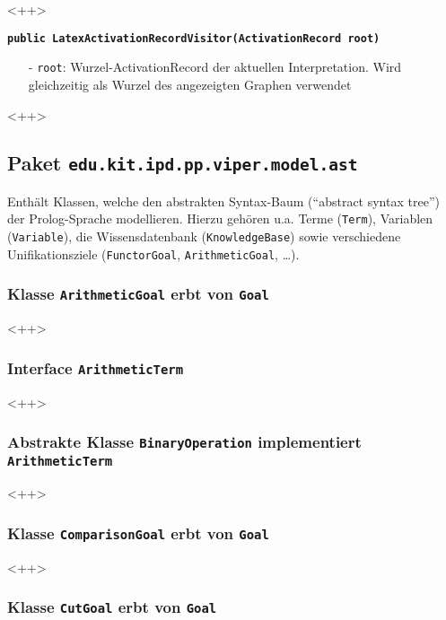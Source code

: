 \documentclass[parskip=full,11pt,twoside]{scrartcl}
\begin{document}
<++>

\textbf{\texttt{public LatexActivationRecordVisitor(ActivationRecord root)}}
\begin{itemize}[noitemsep]
	\item[-] \texttt{root}: Wurzel-ActivationRecord der aktuellen Interpretation. Wird gleichzeitig als Wurzel des angezeigten Graphen verwendet
\end{itemize}
<++>

\subsection{Paket \texttt{edu.kit.ipd.pp.viper.model.ast}}

Enthält Klassen, welche den abstrakten Syntax-Baum (\enquote{abstract syntax tree}) der Prolog-Sprache modellieren. Hierzu gehören u.a. Terme (\texttt{Term}), Variablen (\texttt{Variable}), die Wissensdatenbank (\texttt{KnowledgeBase}) sowie verschiedene Unifikationsziele (\texttt{FunctorGoal}, \texttt{ArithmeticGoal}, \dots).

\subsubsection{Klasse \texttt{ArithmeticGoal} erbt von \texttt{Goal}}

<++>

\subsubsection{Interface \texttt{ArithmeticTerm}}

<++>

\subsubsection{Abstrakte Klasse \texttt{BinaryOperation} implementiert \texttt{ArithmeticTerm}}

<++>

\subsubsection{Klasse \texttt{ComparisonGoal} erbt von \texttt{Goal}}

<++>

\subsubsection{Klasse \texttt{CutGoal} erbt von \texttt{Goal}}
\end{document}
